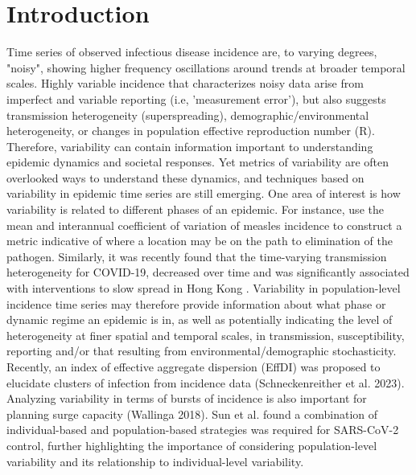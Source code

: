 \documentclass[10pt,letterpaper]{article}
\begin{document}
\section*{Introduction}
Time series of observed infectious disease incidence are, to varying degrees, "noisy", showing higher frequency oscillations around trends at broader temporal scales. Highly variable incidence that characterizes noisy data arise from imperfect and variable reporting (i.e, 'measurement error'), but also suggests transmission heterogeneity (superspreading), demographic/environmental heterogeneity, or changes in population effective reproduction number (R). Therefore, variability can contain information important to understanding epidemic dynamics and societal responses. Yet metrics of variability are often overlooked ways to understand these dynamics, and techniques based on variability in epidemic time series are still emerging. One area of interest is how variability is related to different phases of an epidemic. For instance, \cite{graham2019measles} use the mean and interannual coefficient of variation of measles incidence to construct a metric indicative of where a location may be on the path to elimination of the pathogen. Similarly, it was recently found that the time-varying transmission heterogeneity for COVID-19, decreased over time and was significantly associated with interventions to slow spread in Hong Kong \cite{adam2022time}. Variability in population-level incidence time series may therefore provide information about what phase or dynamic regime an epidemic is in, as well as potentially indicating the level of heterogeneity at finer spatial and temporal scales, in transmission, susceptibility, reporting and/or that resulting from environmental/demographic stochasticity. Recently, an index of effective aggregate dispersion (EffDI) was proposed to elucidate clusters of infection from incidence data (Schneckenreither et al. 2023). Analyzing variability in terms of bursts of incidence is also important for planning surge capacity (Wallinga 2018). Sun et al. \cite{sun2021transmission} found a combination of individual-based and population-based strategies was required for SARS-CoV-2 control, further highlighting the importance of considering population-level variability and its relationship to individual-level variability.
\end{document}
